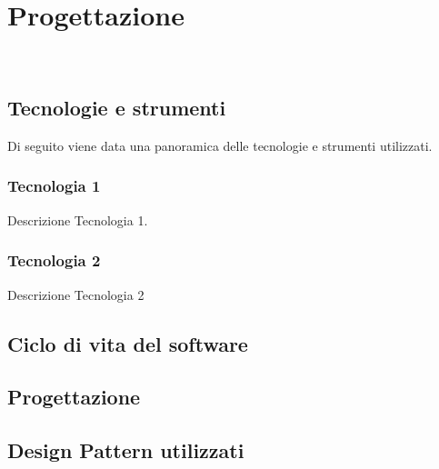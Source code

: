 
\chapter{Progettazione} %
\label{cap:progettazione}

\\

\section{Tecnologie e strumenti} %
\label{sec:tecnologie-strumenti}

Di seguito viene data una panoramica delle tecnologie e strumenti utilizzati.

\subsection*{Tecnologia 1}
Descrizione Tecnologia 1.

\subsection*{Tecnologia 2}
Descrizione Tecnologia 2

\section{Ciclo di vita del software}
\label{sec:ciclo-vita-software}

\section{Progettazione}
\label{sec:progettazione}




\section{Design Pattern utilizzati}

